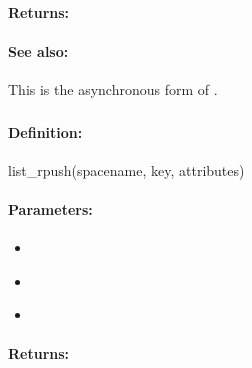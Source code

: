 \paragraph{Returns:}


\paragraph{See also:}  This is the asynchronous form of .

\pagebreak
\subsubsection{}
\label{api:ruby:list_rpush}


\paragraph{Definition:}
\begin{rubycode}
list_rpush(spacename, key, attributes)
\end{rubycode}

\paragraph{Parameters:}
\begin{itemize}[noitemsep]
\item {}\\

\item {}\\

\item {}\\

\end{itemize}

\paragraph{Returns:}


\pagebreak
\subsubsection{}
\label{api:ruby:async_list_rpush}


